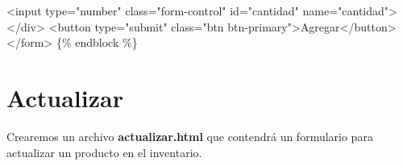 \documentclass[
  a4paper,
  DIV=11,
  numbers=noendperiod,
  onepage,
  openany]{scrreprt}
\newenvironment{Shaded}{\begin{snugshade}}{\end{snugshade}}
\newcommand{\DataTypeTok}[1]{\textcolor[rgb]{0.68,0.00,0.00}{#1}}
\newcommand{\KeywordTok}[1]{\textcolor[rgb]{0.00,0.23,0.31}{#1}}
\newcommand{\NormalTok}[1]{\textcolor[rgb]{0.00,0.23,0.31}{#1}}
\newcommand{\OperatorTok}[1]{\textcolor[rgb]{0.37,0.37,0.37}{#1}}
\newcommand{\OtherTok}[1]{\textcolor[rgb]{0.00,0.23,0.31}{#1}}
\newcommand{\StringTok}[1]{\textcolor[rgb]{0.13,0.47,0.30}{#1}}
\begin{document}
\begin{Shaded}
\begin{Highlighting}[]
        \DataTypeTok{\textless{}}\KeywordTok{input}\OtherTok{ type}\OperatorTok{=}\StringTok{"number"}\OtherTok{ class}\OperatorTok{=}\StringTok{"form{-}control"}\OtherTok{ id}\OperatorTok{=}\StringTok{"cantidad"}\OtherTok{ name}\OperatorTok{=}\StringTok{"cantidad"}\DataTypeTok{\textgreater{}}
    \DataTypeTok{\textless{}/}\KeywordTok{div}\DataTypeTok{\textgreater{}}
    \DataTypeTok{\textless{}}\KeywordTok{button}\OtherTok{ type}\OperatorTok{=}\StringTok{"submit"}\OtherTok{ class}\OperatorTok{=}\StringTok{"btn btn{-}primary"}\DataTypeTok{\textgreater{}}\NormalTok{Agregar}\DataTypeTok{\textless{}/}\KeywordTok{button}\DataTypeTok{\textgreater{}}
\DataTypeTok{\textless{}/}\KeywordTok{form}\DataTypeTok{\textgreater{}}
\NormalTok{\{\% endblock \%\}}
\end{Highlighting}
\end{Shaded}

\section{Actualizar}\label{actualizar}

Crearemos un archivo \textbf{actualizar.html} que contendrá un
formulario para actualizar un producto en el inventario.
\end{document}
